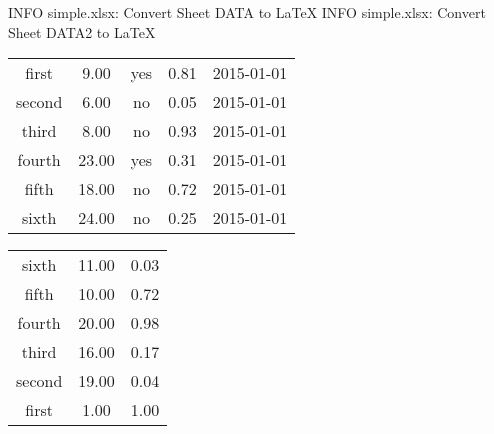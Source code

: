  INFO simple.xlsx: Convert Sheet DATA to LaTeX
 INFO simple.xlsx: Convert Sheet DATA2 to LaTeX
%
%


%
%
\begin{tabular}{c|c|c|c|c|}
first & 9.00 & yes & 0.81 & 2015-01-01\\
second & 6.00 & no & 0.05 & 2015-01-01\\
third & 8.00 & no & 0.93 & 2015-01-01\\
fourth & 23.00 & yes & 0.31 & 2015-01-01\\
fifth & 18.00 & no & 0.72 & 2015-01-01\\
sixth & 24.00 & no & 0.25 & 2015-01-01
\end{tabular}

%
%
\begin{tabular}{c|c|c|}
sixth & 11.00 & 0.03\\
fifth & 10.00 & 0.72\\
fourth & 20.00 & 0.98\\
third & 16.00 & 0.17\\
second & 19.00 & 0.04\\
first & 1.00 & 1.00
\end{tabular}
